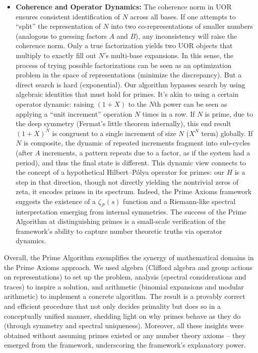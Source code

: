 \documentclass[11pt]{article}
\begin{document}
\begin{itemize}
    \item \textbf{Coherence and Operator Dynamics:} The coherence norm in UOR ensures consistent identification of $N$ across all bases. If one attempts to “split” the representation of $N$ into two co-representations of smaller numbers (analogous to guessing factors $A$ and $B$), any inconsistency will raise the coherence norm. Only a true factorization yields two UOR objects that multiply to exactly fill out $N$’s multi-base expansions. In this sense, the process of trying possible factorizations can be seen as an optimization problem in the space of representations (minimize the discrepancy). But a direct search is hard (exponential). Our algorithm bypasses search by using algebraic identities that must hold for primes. It’s akin to using a certain operator dynamic: raising $(1+X)$ to the $N$th power can be seen as applying a “unit increment” operation $N$ times in a row. If $N$ is prime, due to the deep symmetry (Fermat’s little theorem internally), this end result $(1+X)^N$ is congruent to a single increment of size $N$ ($X^N$ term) globally. If $N$ is composite, the dynamic of repeated increments fragment into sub-cycles (after $A$ increments, a pattern repeats due to a factor, as if the system had a period), and thus the final state is different. This dynamic view connects to the concept of a hypothetical Hilbert–Pólya operator for primes: our $H$ is a step in that direction, though not directly yielding the nontrivial zeros of zeta, it encodes primes in its spectrum. Indeed, the Prime Axioms framework suggests the existence of a $\zeta_{\mathcal{P}}(s)$ function and a Riemann-like spectral interpretation emerging from internal symmetries. The success of the Prime Algorithm at distinguishing primes is a small-scale verification of the framework’s ability to capture number theoretic truths via operator dynamics.
\end{itemize}

Overall, the Prime Algorithm exemplifies the synergy of mathematical domains in the Prime Axioms approach. We used algebra (Clifford algebra and group actions on representations) to set up the problem, analysis (spectral considerations and traces) to inspire a solution, and arithmetic (binomial expansions and modular arithmetic) to implement a concrete algorithm. The result is a provably correct and efficient procedure that not only decides primality but does so in a conceptually unified manner, shedding light on why primes behave as they do (through symmetry and spectral uniqueness). Moreover, all these insights were obtained without assuming primes existed or any number theory axioms – they emerged from the framework, underscoring the framework’s explanatory power.
\end{document}
